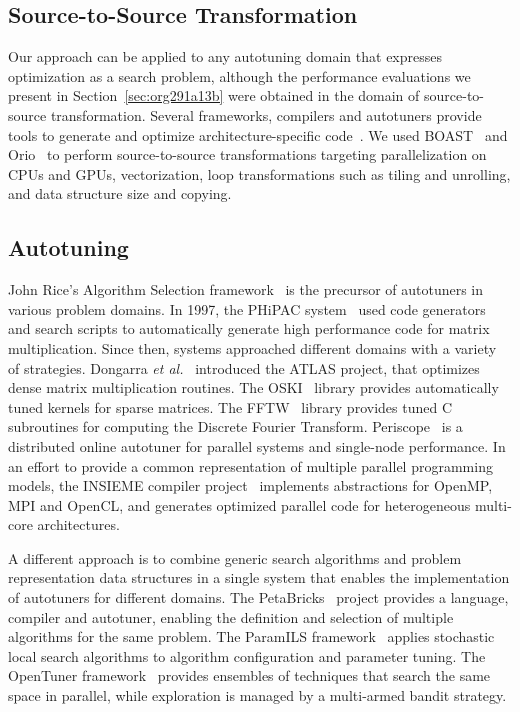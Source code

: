 \documentclass[conference]{IEEEtran}
\begin{document}
\subsection{Source-to-Source Transformation}
\label{sec:org3991927}
Our approach can be applied to any autotuning domain that expresses optimization
as  a  search  problem,  although  the performance  evaluations  we  present  in
Section~\ref{sec:org291a13b}  were obtained in the  domain of source-to-source
transformation. Several  frameworks, compilers  and autotuners provide  tools to
generate             and              optimize             architecture-specific
code~\cite{hartono2009annotation,videau2017boast,tiwari2009scalable,yi2007poet,ansel2009petabricks}.
We  used BOAST~\cite{videau2017boast}  and Orio~\cite{hartono2009annotation}  to
perform source-to-source  transformations targeting parallelization on  CPUs and
GPUs, vectorization, loop transformations such as tiling and unrolling, and data
structure size and copying.
\subsection{Autotuning}
\label{sec:orga54b1bd}
John  Rice's  Algorithm   Selection  framework~\cite{rice1976algorithm}  is  the
precursor  of  autotuners  in  various  problem domains.  In  1997,  the  PHiPAC
system~\cite{bilmes1997optimizing} used  code generators  and search  scripts to
automatically generate  high performance  code for matrix  multiplication. Since
then,  systems  approached  different  domains with  a  variety  of  strategies.
Dongarra  \emph{et  al.}~\cite{dongarra1998automatically}  introduced  the  ATLAS
project,   that   optimizes   dense    matrix   multiplication   routines.   The
OSKI~\cite{vuduc2005oski}  library  provides  automatically  tuned  kernels  for
sparse  matrices.   The  FFTW~\cite{frigo1998fftw}  library  provides   tuned  C
subroutines     for     computing     the    Discrete     Fourier     Transform.
Periscope~\cite{gerndt2010automatic}  is  a  distributed  online  autotuner  for
parallel systems and  single-node performance. In an effort to  provide a common
representation  of multiple  parallel programming  models, the  INSIEME compiler
project~\cite{jordan2012multi}  implements  abstractions  for  OpenMP,  MPI  and
OpenCL,  and  generates optimized  parallel  code  for heterogeneous  multi-core
architectures.

A  different  approach is  to  combine  generic  search algorithms  and  problem
representation   data  structures   in  a   single  system   that  enables   the
implementation     of     autotuners      for     different     domains.     The
PetaBricks~\cite{ansel2009petabricks} project provides  a language, compiler and
autotuner, enabling the definition and  selection of multiple algorithms for the
same   problem.   The   ParamILS   framework~\cite{hutter2009paramils}   applies
stochastic  local search  algorithms  to algorithm  configuration and  parameter
tuning. The OpenTuner  framework~\cite{ansel2014opentuner} provides ensembles of
techniques that search the same space  in parallel, while exploration is managed
by a multi-armed bandit strategy.
\end{document}
